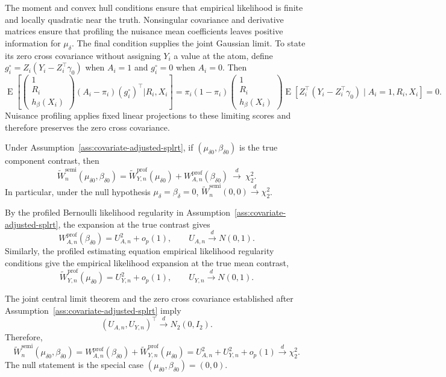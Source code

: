 \documentclass[11pt]{article}
\DeclareMathOperator{\E}{E}
\begin{document}
The moment and convex hull conditions ensure that empirical likelihood is finite and locally quadratic near the truth. Nonsingular covariance and derivative matrices ensure that profiling the nuisance mean coefficients leaves positive information for $\mu_\delta$. The final condition supplies the joint Gaussian limit. To state its zero cross covariance without assigning $Y_i$ a value at the atom, define $g_i^\circ=Z_i(Y_i-Z_i^\top\gamma_0)$ when $A_i=1$ and $g_i^\circ=0$ when $A_i=0$. Then
\[
  \E\!\left[
    \begin{pmatrix}1\\R_i\\h_\beta(X_i)\end{pmatrix}
    (A_i-\pi_i)(g_i^\circ)^\top
    \mathrel{\big|}R_i,X_i
  \right]
  =
  \pi_i(1-\pi_i)
  \begin{pmatrix}1\\R_i\\h_\beta(X_i)\end{pmatrix}
  \E[Z_i^\top(Y_i-Z_i^\top\gamma_0)\mid A_i=1,R_i,X_i]
  =0.
\]
Nuisance profiling applies fixed linear projections to these limiting scores and therefore preserves the zero cross covariance.


\begin{mainproposition}\label{prop:covariate-adjusted-splrt}
Under Assumption~\ref{ass:covariate-adjusted-splrt}, if $(\mu_{\delta0},\beta_{\delta0})$ is the true component contrast, then
\[
  \widetilde{W}_n^{\mathrm{semi}}(\mu_{\delta0},\beta_{\delta0})
  =
  \widetilde{W}_{Y,n}^{\mathrm{prof}}(\mu_{\delta0})
  +W_{A,n}^{\mathrm{prof}}(\beta_{\delta0})
  \ \overset{d}{\longrightarrow}\ \chi^2_2.
\]
In particular, under the null hypothesis $\mu_\delta=\beta_\delta=0$, $\widetilde{W}_n^{\mathrm{semi}}(0,0)\overset{d}{\longrightarrow}\chi^2_2$.
\end{mainproposition}


\begin{mainproof}
By the profiled Bernoulli likelihood regularity in
Assumption~\ref{ass:covariate-adjusted-splrt}, the expansion at the true contrast gives
\[
  W_{A,n}^{\mathrm{prof}}(\beta_{\delta0})=U_{A,n}^2+o_p(1),
  \qquad
  U_{A,n}\overset{d}{\longrightarrow}N(0,1).
\]
Similarly, the profiled estimating equation empirical likelihood regularity
conditions give the empirical likelihood expansion at the true mean contrast,
\[
  \widetilde{W}_{Y,n}^{\mathrm{prof}}(\mu_{\delta0})=U_{Y,n}^2+o_p(1),
  \qquad
  U_{Y,n}\overset{d}{\longrightarrow}N(0,1).
\]

The joint central limit theorem and the zero cross covariance established after Assumption~\ref{ass:covariate-adjusted-splrt} imply
\[
  (U_{A,n},U_{Y,n})^\top\overset{d}{\longrightarrow}N_2(0,I_2).
\]
Therefore,
\[
  \widetilde{W}_n^{\mathrm{semi}}(\mu_{\delta0},\beta_{\delta0})
  =
  W_{A,n}^{\mathrm{prof}}(\beta_{\delta0})
  +\widetilde{W}_{Y,n}^{\mathrm{prof}}(\mu_{\delta0})
  =
  U_{A,n}^2+U_{Y,n}^2+o_p(1)
  \overset{d}{\longrightarrow}\chi^2_2.
\]
The null statement is the special case $(\mu_{\delta0},\beta_{\delta0})=(0,0)$.
\end{mainproof}
\end{document}
